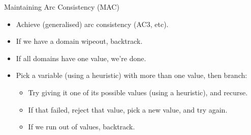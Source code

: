 \documentclass{beamer}
\begin{document}
\begin{frame}{Maintaining Arc Consistency (MAC)}
    \begin{itemize}
        \item Achieve (generalised) arc consistency (AC3, etc).
        \item If we have a domain wipeout, backtrack.
        \item If all domains have one value, we're done.
        \item Pick a variable (using a heuristic) with more than one value, then branch:
            \begin{itemize}
                \item Try giving it one of its possible values (using a heuristic), and recurse.
                \item If that failed, reject that value, pick a new value, and try again.
                \item If we run out of values, backtrack.
            \end{itemize}
    \end{itemize}
\end{frame}
\end{document}
